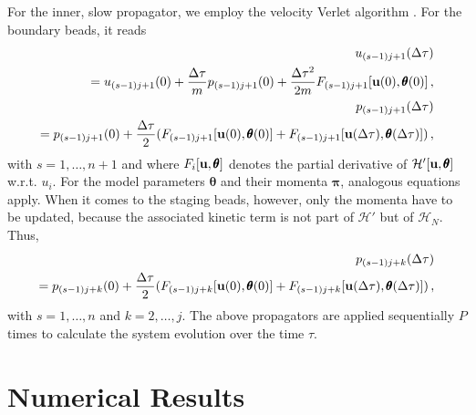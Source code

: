 \documentclass[12pt,a4paper,final]{iopart}
\newcommand{\bt}{\pmb\theta}
\newcommand{\vc}[1]{{\bf #1 }}
\begin{document}
For the inner, slow propagator, we employ the velocity Verlet algorithm \cite{swope_1982_verlet}.
For the boundary beads, it reads
\begin{eqnarray}
  u_{(s-1)j+1}(\Delta\tau) \nonumber \\
  = u_{(s-1)j+1}(0)
  +
  \frac{\Delta\tau}{m} p_{(s-1)j+1}(0)
  +
  \frac{\Delta \tau^2}{2m}
  F_{(s-1)j+1}[\vc u(0),{\pmb\theta}(0)]\,,\\
  p_{(s-1)j+1}(\Delta\tau) \nonumber \\
  = p_{(s-1)j+1}(0)
  +
  \frac{\Delta\tau}{2}
  (
  F_{(s-1)j+1}[\vc u(0),{\pmb\theta}(0)]
  +
  F_{(s-1)j+1}[\vc u(\Delta\tau),{\pmb\theta}(\Delta\tau)]
  )\,,
\end{eqnarray}
with $s=1,\dots,n+1$ and where $F_i[\vc u,{\pmb\theta}]$ denotes the partial derivative of $\mathcal H'[\vc u,{\pmb\theta}]$ w.r.t. $u_i$.
For the model parameters $\bt$ and their momenta ${\pmb\pi}$, analogous equations apply.
When it comes to the staging beads, however, only the momenta have to be updated, because the associated kinetic term is not part of $\mathcal H'$ but of $\mathcal H_N$.
Thus,
\begin{eqnarray}
  p_{(s-1)j+k}(\Delta\tau) \nonumber \\
  =
  p_{(s-1)j+k}(0)
  +
  \frac{\Delta\tau}{2}
  (
  F_{(s-1)j+k}[\vc u(0),{\pmb\theta}(0)]
  +
  F_{(s-1)j+k}[\vc u(\Delta\tau),{\pmb\theta}(\Delta\tau)]
  )
  \,,
\end{eqnarray}
with $s=1,\dots,n$ and $k=2,\dots,j$. The above propagators are applied sequentially $P$ times to calculate the system evolution over the time $\tau$.



\section{Numerical Results}\label{numerical_results}
\end{document}
